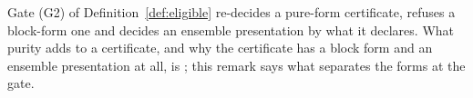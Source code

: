 
Gate (G2) of Definition~\ref{def:eligible} re-decides a pure-form
certificate, refuses a block-form one and decides an ensemble presentation by
what it declares. What purity adds to a certificate, and why the certificate
has a block form and an ensemble presentation at all, is
; this remark says what separates the
forms at the gate.

